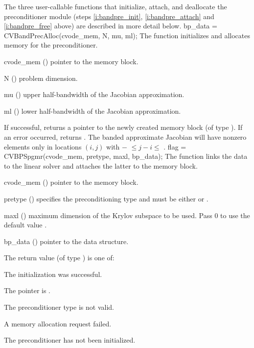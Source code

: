 The three user-callable functions that initialize, attach, and deallocate
the {\cvbandpre} preconditioner module (steps \ref{i:bandpre_init},
\ref{i:bandpre_attach} and \ref{i:bandpre_free} above) are described
in more detail below.
{
  bp\_data = CVBandPrecAlloc(cvode\_mem, N, mu, ml);
}
{
  The function  initializes and allocates
  memory for the {\cvbandpre} preconditioner.
}
{
  \begin{args}
  \item[cvode\_mem] ()
    pointer to the {\cvodes} memory block.
  \item[N] ()
    problem dimension.
  \item[mu] ()
    upper half-bandwidth of the Jacobian approximation.
  \item[ml] ()
    lower half-bandwidth of the Jacobian approximation.
  \end{args}
}
{
  If successful,  returns a pointer to the newly created 
  {\cvbandpre} memory block (of type ).
  If an error occurred,  returns .
}
{
  The banded approximate Jacobian will have nonzero elements only in locations
  $(i,j)$ with $-$ $\leq j-i \leq$ .
}
{
  flag = CVBPSpgmr(cvode\_mem, pretype, maxl, bp\_data);
}
{
  The function  links the {\cvbandpre} data to the
  {\cvspgmr} linear solver and attaches the latter to the {\cvodes}
  memory block.
}
{
  \begin{args}
  \item[cvode\_mem] ()
    pointer to the {\cvodes} memory block.
  \item[pretype] ()
    specifies the preconditioning type and must be either
     or .
  \item[maxl] ()
    maximum dimension of the Krylov subspace to be used. Pass $0$ to use the 
    default value .
  \item[bp\_data] ()
    pointer to the {\cvbandpre} data structure.
  \end{args}
}
{
  The return value  (of type ) is one of:
  \begin{args}
  \item[\Id{CVSPGMR\_SUCCESS}] 
    The {\cvspgmr} initialization was successful.
  \item[\Id{CVSPGMR\_MEM\_NULL}]
    The  pointer is .
  \item[\Id{CVSPGMR\_ILL\_INPUT}]
    The preconditioner type  is not valid.
  \item[\Id{CVSPGMR\_MEM\_FAIL}]
    A memory allocation request failed.
  \item[\Id{CV\_PDATA\_NULL}]
    The {\cvbandpre} preconditioner has not been initialized.
  \end{args}
}
